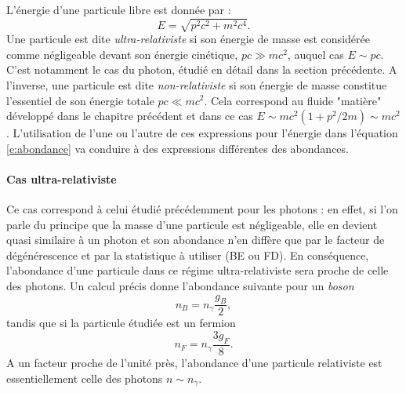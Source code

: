L'énergie d'une particule libre est donnée par :
\begin{equation}
E=\sqrt{p^2c^2+m^2c^4}.
\end{equation}
 Une particule est dite \textit{ultra-relativiste} si son énergie de masse est considérée comme négligeable devant son énergie cinétique, $pc\gg mc^2$, auquel cas $E\sim pc$. C'est notamment le cas du photon, étudié en détail dans la section précédente. A l'inverse, une particule est dite \textit{non-relativiste} si son énergie de masse constitue l'essentiel de son énergie totale $pc \ll mc^2$. Cela correspond au fluide "matière" développé dans le chapitre précédent et dans ce cas $E\sim mc^2 (1+ p^2/2m) \sim mc^2$. L'utilisation de l'une ou l'autre de ces expressions pour l'énergie dans l'équation \ref{e:abondance} va conduire à des expressions différentes des abondances.
 
 \paragraph{Cas ultra-relativiste}
Ce cas correspond à celui étudié précédemment pour les photons : en effet, si l'on parle du principe que la masse d'une particule est négligeable, elle en devient quasi similaire à un photon et son abondance n'en diffère que par le facteur de dégénérescence et par la statistique à utiliser (BE ou FD). En conséquence, l'abondance d'une particule dans ce régime ultra-relativiste sera proche de celle des photons. Un calcul précis donne l'abondance suivante pour un \textit{boson}
\begin{equation}
n_B=n_\gamma\frac{g_B}{2},
\end{equation}
tandis que si la particule étudiée est un fermion
\begin{equation}
n_F=n_\gamma\frac{3g_F}{8}.
\end{equation}
A un facteur proche de l'unité près, l'abondance d'une particule relativiste est essentiellement celle des photons $n\sim n_\gamma$.

